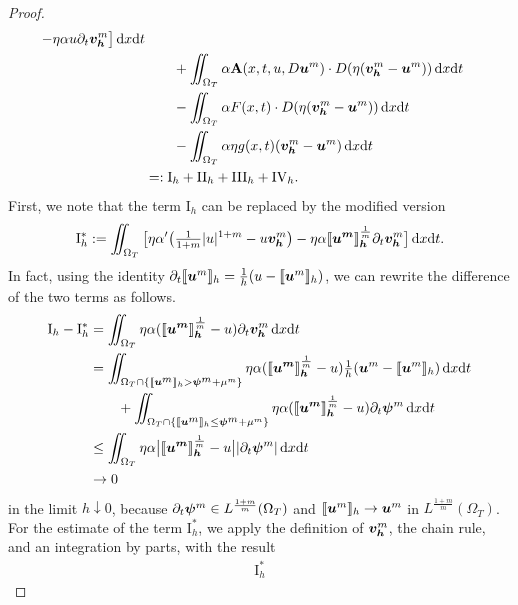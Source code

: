 \documentclass[a4paper, 10pt, american]{amsart}
\numberwithin{theorem}{section}
\numberwithin{equation}{section}
\newcommand{\dxdt}{\,\mathrm{d}x\mathrm{d}t}
\newcommand{\power}[2]{\bm{#1^{\mbox{\unboldmath{\scriptsize$#2$}}}}}
\begin{document}
\begin{proof}
\begin{align}
  -\eta\alpha u\partial_t\power{v_h}{m}\big] \dxdt\\\nonumber
  &\qquad+
  \iint_{\Omega_T}\alpha \mathbf{A}(x,t,u,D\power{u}{m})\cdot
  D(\eta(\power{v_h}{m}-\power um))\dxdt\\\nonumber
  &\qquad - \iint_{\Omega_T} \alpha F(x,t) \cdot D(\eta(\power{v_h}{m}-\power um))\dxdt\\\nonumber
 &\qquad - \iint_{\Omega_T}  \alpha\eta g(x,t) (\power{v_h}{m}-\power um) \dxdt \\\nonumber
  &=:\mathrm{I}_h+\mathrm{II}_h+\mathrm{III}_h+\mathrm{IV}_h.
\end{align}
First, we note that the term $\mathrm{I}_h$ can be replaced by the
modified version 
\begin{align}\label{I-h-ast-01}
  \mathrm{I}^\ast_h
  :=
  \iint_{\Omega_T}\big[\eta\alpha'\big(\tfrac1{1+m}|u|^{1+m}-u\power{v_h}{m}\big)-\eta\alpha \power{\llbracket u^m\rrbracket_h}{\frac1m}\partial_t\power{v_h}{m}\big]\dxdt.
\end{align}
In fact, using the identity $\partial_t\llbracket
\power um\rrbracket_h=\frac1h(u-\llbracket \power um\rrbracket_h)$, we can
rewrite the difference of the two terms as follows. 
\begin{align*}
  \mathrm{I}_h-\mathrm{I}_h^\ast
  &=
  \iint_{\Omega_T}\eta\alpha(\power{\llbracket u^m\rrbracket_h}{\frac1m}-u)\partial_t\power{v_h}{m}\dxdt\\
  &=
  \iint_{\Omega_T\cap\{\llbracket\power{u}{m}\rrbracket_h>\power\psi
    m+\mu^m\}}
  \eta\alpha(\power{\llbracket u^m\rrbracket_h}{\frac1m}-u)\tfrac1h(\power um-\llbracket\power{u}{m}\rrbracket_h)\dxdt\\
  &\qquad+
  \iint_{\Omega_T\cap\{\llbracket\power{u}{m}\rrbracket_h\le\power\psi
    m+\mu^m\}}\eta\alpha(\power{\llbracket u^m\rrbracket_h}{\frac1m}-u)\partial_t\power{\psi}{m}\dxdt\\
  &\le
  \iint_{\Omega_T}\eta\alpha\big|\power{\llbracket u^m\rrbracket_h}{\frac1m}-u\big||\partial_t\power{\psi}{m}|\dxdt\\
  &\to0
\end{align*}
in the limit $h\downarrow0$, because $\partial_t\power\psi m\in
L^{\frac{1+m}m}(\Omega_T)$ and $\llbracket\power{u}{m}\rrbracket_h\to\power um$ in $L^{\frac{1+m}m}(\Omega_T)$. 
For the estimate of the 
 term $\mathrm{I}_h^\ast$, we apply the definition of $\power{v_h}{m}$, the chain rule, and
an integration by parts, with the result 
\begin{align}\label{I-h-ast}
  \mathrm{I}_h^\ast

\end{align}
\end{proof}
\end{document}

